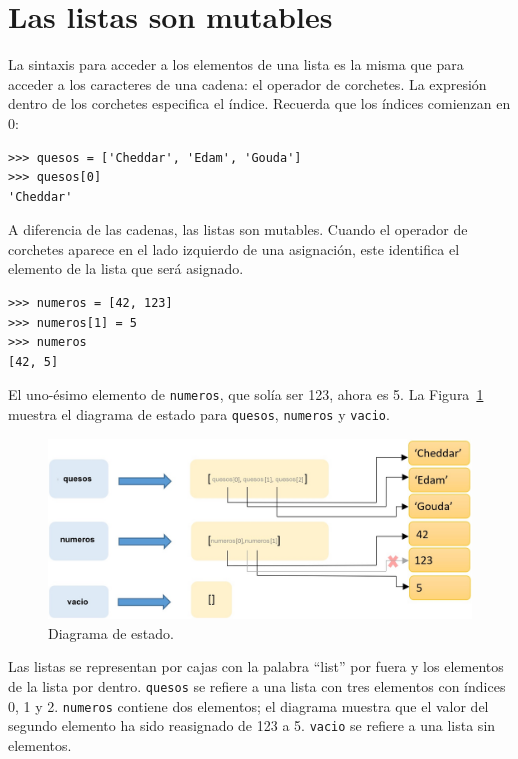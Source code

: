 
\section{Las listas son mutables}
\label{mutable}

La sintaxis para acceder a los elementos de una lista es la misma que para
acceder a los caracteres de una cadena: el operador de corchetes.  La
expresión dentro de los corchetes especifica el índice.  Recuerda que los
índices comienzan en 0:

\begin{Verbatim}[frame=single]
>>> quesos = ['Cheddar', 'Edam', 'Gouda']
>>> quesos[0]
'Cheddar'
\end{Verbatim}
%
A diferencia de las cadenas, las listas son mutables.  Cuando el operador de corchetes aparece
en el lado izquierdo de una asignación, este identifica el elemento de la
lista que será asignado.

\begin{Verbatim}[frame=single]
>>> numeros = [42, 123]
>>> numeros[1] = 5
>>> numeros
[42, 5]
\end{Verbatim}
%
El uno-ésimo elemento de \texttt{numeros}, que
solía ser 123, ahora es 5.
%
La Figura~\ref{fig.liststate} muestra
el diagrama de estado para \texttt{quesos}, \texttt{numeros} y \texttt{vacio}.

\begin{figure}
\centerline
{\includegraphics[scale=0.3]{images/state-diagram.jpg}}
\caption{Diagrama de estado.}
\label{fig.liststate}
\end{figure}

Las listas se representan por cajas con la palabra ``list'' por fuera
y los elementos de la lista por dentro.  \texttt{quesos} se refiere a
una lista con tres elementos con índices 0, 1 y 2.
\texttt{numeros} contiene dos elementos; el diagrama muestra que el
valor del segundo elemento ha sido reasignado de 123 a 5.
\texttt{vacio} se refiere a una lista sin elementos.



